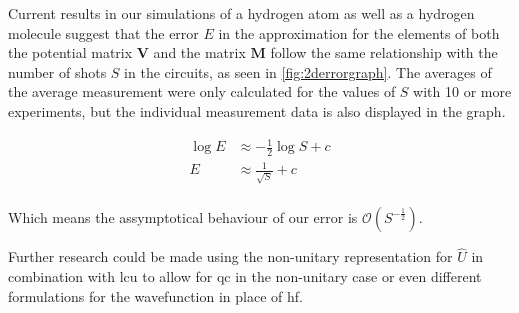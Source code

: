 \documentclass{aux/ttuthes2007}
\begin{document}
Current results in our simulations of a hydrogen atom as well as a hydrogen molecule suggest that the error $E$ in the approximation for the elements of both the potential matrix $\bm V$ and the matrix $\bm M$ follow the same relationship with the number of shots $S$ in the circuits, as seen in \ref{fig:2derrorgraph}. The averages of the average measurement were only calculated for the values of $S$ with 10 or more experiments, but the individual measurement data is also displayed in the graph.

\begin{equation*}
	\begin{split}
		\log E &\approx -\frac 1 2 \log S + c \\
		E &\approx \frac 1 {\sqrt{S}} + c \\
	\end{split}
\end{equation*}

Which means the assymptotical behaviour of our error is $\mathcal O(S^{-\frac 1 2})$.

Further research could be made using the non-unitary representation for $\hat U$ in combination with \gls{lcu} to allow for \gls{qc} in the non-unitary case or even different formulations for the wavefunction in place of \gls{hf}.


\backmatter





\glsaddall

\printnoidxglossary[type=acronym,sort=letter]
\end{document}
